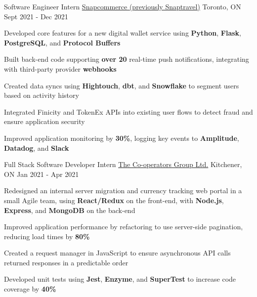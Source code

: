 
\begin{cventries}
  \cventry
    {Software Engineer Intern} %
    {\href{https://www.snapcommerce.com/}{Snapcommerce (previously Snaptravel)}} %
    {Toronto, ON} %
    {Sept 2021 - Dec 2021} %
    {
      \begin{cvitems} %
      \item {Developed core features for a new digital wallet service using \textbf{Python}, \textbf{Flask}, \textbf{PostgreSQL}, and \textbf{Protocol Buffers}}
      \item {Built back-end code supporting \textbf{over 20} real-time push notifications, integrating with third-party provider \textbf{webhooks}}
      \item {Created data syncs using \textbf{Hightouch}, \textbf{dbt}, and \textbf{Snowflake} to segment users based on activity history}
      \item {Integrated Finicity and TokenEx APIs into existing user flows to detect fraud and ensure application security}
      \item {Improved application monitoring by \textbf{30\%}, logging key events to \textbf{Amplitude}, \textbf{Datadog}, and \textbf{Slack}}
      \end{cvitems}
    }

  \cventry
    {Full Stack Software Developer Intern} %
    {\href{https://www.cooperators.ca/}{The Co-operators Group Ltd.}} %
    {Kitchener, ON} %
    {Jan 2021 - Apr 2021} %
    {
      \begin{cvitems} %
      \item {Redesigned an internal server migration and currency tracking web portal in a small Agile team, using \textbf{React/Redux} on the front-end, with \textbf{Node.js}, \textbf{Express}, and \textbf{MongoDB} on the back-end}
      \item {Improved application performance by refactoring to use server-side pagination, reducing load times by \textbf{80\%}}
      \item {Created a request manager in JavaScript to ensure asynchronous API calls returned responses in a predictable order}
      \item {Developed unit tests using \textbf{Jest}, \textbf{Enzyme}, and \textbf{SuperTest} to increase code coverage by \textbf{40\%}}
      \end{cvitems}
    }
    

\end{cventries}
